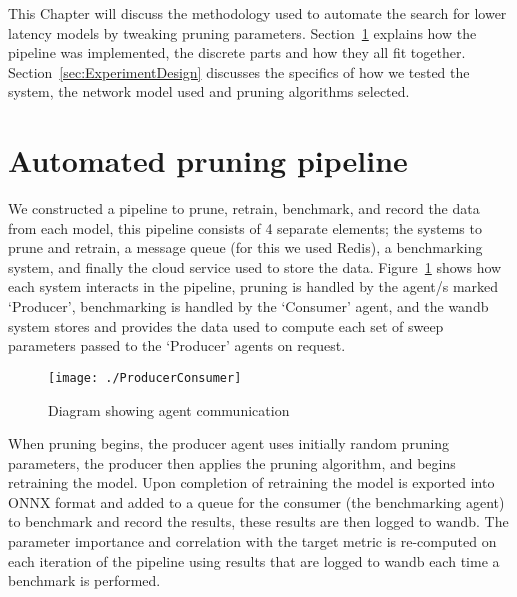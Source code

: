 \documentclass[../Dissertation.tex]{subfiles}
\begin{document}

This Chapter will discuss the methodology used to automate the search for lower latency models by tweaking pruning parameters.
Section~\ref{sec:EngineeringImplementation} explains how the pipeline was implemented, the discrete parts and how they all fit together.
Section~\ref{sec:ExperimentDesign} discusses the specifics of how we tested the system, the network model used and pruning algorithms selected.

\section{Automated pruning pipeline}\label{sec:EngineeringImplementation}

We constructed a pipeline to prune, retrain, benchmark, and record the data from each model, this pipeline consists of 4 separate elements; the systems to prune and retrain, a message queue  (for this we used Redis), a benchmarking system, and finally the cloud service used to store the data.
Figure~\ref{fig:agentCommunication} shows how each system interacts in the pipeline, pruning is handled by the agent/s marked `Producer', benchmarking is handled by the `Consumer' agent, and the \acrfull{wandb} system stores and provides the data used to compute each set of sweep parameters passed to the `Producer' agents on request.

\begin{figure}[H]
    \centering
    \texttt{[image: ./ProducerConsumer]}
    \caption{Diagram showing agent communication}
    \label{fig:agentCommunication}
\end{figure}

When pruning begins, the producer agent uses initially random pruning parameters, the producer then applies the pruning algorithm, and begins retraining the model.
Upon completion of retraining the model is exported into ONNX format and added to a queue for the consumer (the benchmarking agent) to benchmark and record the results, these results are then logged to \acrshort{wandb}.
The parameter importance and correlation with the target metric is re-computed on each iteration of the pipeline using results that are logged to \acrshort{wandb} each time a benchmark is performed.
\end{document}
